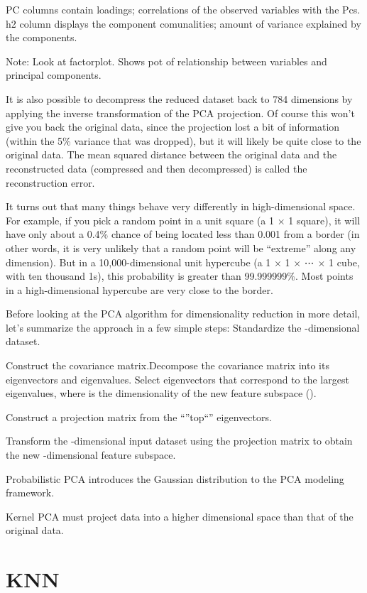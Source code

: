 \documentclass[]{book}
\theoremstyle{definition}
\theoremstyle{definition}
\theoremstyle{definition}
\theoremstyle{remark}
\begin{document}
PC columns contain loadings; correlations of the observed variables with
the Pcs. h2 column displays the component comunalities; amount of
variance explained by the components.

Note: Look at factorplot. Shows pot of relationship between variables
and principal components.

It is also possible to decompress the reduced dataset back to 784
dimensions by applying the inverse transformation of the PCA projection.
Of course this won't give you back the original data, since the
projection lost a bit of information (within the 5\% variance that was
dropped), but it will likely be quite close to the original data. The
mean squared distance between the original data and the reconstructed
data (compressed and then decompressed) is called the reconstruction
error.

It turns out that many things behave very differently in
high-dimensional space. For example, if you pick a random point in a
unit square (a 1 × 1 square), it will have only about a 0.4\% chance of
being located less than 0.001 from a border (in other words, it is very
unlikely that a random point will be ``extreme'' along any dimension).
But in a 10,000-dimensional unit hypercube (a 1 × 1 × ⋯ × 1 cube, with
ten thousand 1s), this probability is greater than 99.999999\%. Most
points in a high-dimensional hypercube are very close to the border.

Before looking at the PCA algorithm for dimensionality reduction in more
detail, let's summarize the approach in a few simple steps: Standardize
the -dimensional dataset.

Construct the covariance matrix.Decompose the covariance matrix into its
eigenvectors and eigenvalues. Select eigenvectors that correspond to the
largest eigenvalues, where is the dimensionality of the new feature
subspace ().

Construct a projection matrix from the ``''top``'' eigenvectors.

Transform the -dimensional input dataset using the projection matrix to
obtain the new -dimensional feature subspace.

Probabilistic PCA introduces the Gaussian distribution to the PCA
modeling framework.

Kernel PCA must project data into a higher dimensional space than that
of the original data.

\section{KNN}\label{knn}
\end{document}
